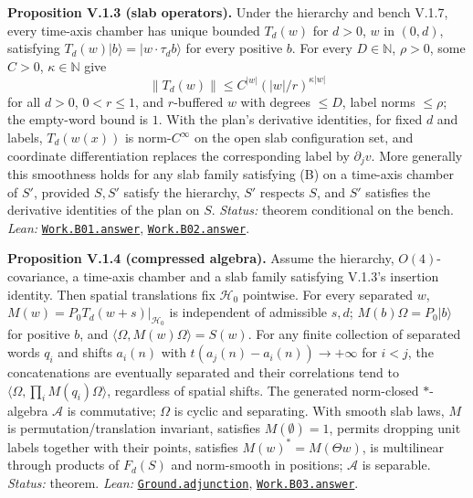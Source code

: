 \documentclass[
  letterpaper,
  11pt]{article}
\begin{document}
\textbf{Proposition V.1.3 (slab operators).} Under the hierarchy and
bench V.1.7, every time-axis chamber has unique bounded \(T_d(w)\) for
\(d>0\), \(w\) in \((0,d)\), satisfying
\(T_d(w)|b\rangle=|w\cdot\tau_db\rangle\) for every positive \(b\). For
every \(D\in\mathbb N\), \(\rho>0\), some \(C>0\),
\(\kappa\in\mathbb N\) give
\[\|T_d(w)\|\le C^{|w|}(|w|/r)^{\kappa|w|} \tag{B}\] for all \(d>0\),
\(0<r\le1\), and \(r\)-buffered \(w\) with degrees \(\le D\), label
norms \(\le\rho\); the empty-word bound is \(1\). With the plan's
derivative identities, for fixed \(d\) and labels, \(T_d(w(x))\) is
norm-\(C^\infty\) on the open slab configuration set, and coordinate
differentiation replaces the corresponding label by \(\partial_jv\).
More generally this smoothness holds for any slab family satisfying (B)
on a time-axis chamber of \(S'\), provided \(S,S'\) satisfy the
hierarchy, \(S'\) respects \(S\), and \(S'\) satisfies the derivative
identities of the plan on \(S\). \emph{Status:} theorem conditional on
the bench. \emph{Lean:}
\href{https://github.com/yang-mills-group/OpenAI-YM-20261028/blob/3456e5e75cf8d4cd558955a5c7638fba2d68f464/YM/Work/B01.lean\#L50-L71}{\texttt{Work.B01.answer}},
\href{https://github.com/yang-mills-group/OpenAI-YM-20261028/blob/3456e5e75cf8d4cd558955a5c7638fba2d68f464/YM/Work/B02.lean\#L17-L30}{\texttt{Work.B02.answer}}.

\textbf{Proposition V.1.4 (compressed algebra).} Assume the hierarchy,
\(O(4)\)-covariance, a time-axis chamber and a slab family satisfying
V.1.3's insertion identity. Then spatial translations fix
\(\mathcal H_0\) pointwise. For every separated \(w\),
\(M(w)=P_0T_d(w+s)|_{\mathcal H_0}\) is independent of admissible
\(s,d\); \(M(b)\Omega=P_0|b\rangle\) for positive \(b\), and
\(\langle\Omega,M(w)\Omega\rangle=S(w)\). For any finite collection of
separated words \(q_i\) and shifts \(a_i(n)\) with
\(t(a_j(n)-a_i(n))\to+\infty\) for \(i<j\), the concatenations are
eventually separated and their correlations tend to
\(\langle\Omega,\prod_iM(q_i)\Omega\rangle\), regardless of spatial
shifts. The generated norm-closed \(*\)-algebra \(\mathcal A\) is
commutative; \(\Omega\) is cyclic and separating. With smooth slab laws,
\(M\) is permutation/translation invariant, satisfies
\(M(\emptyset)=1\), permits dropping unit labels together with their
points, satisfies \(M(w)^*=M(\Theta w)\), is multilinear through
products of \(F_d(S)\) and norm-smooth in positions; \(\mathcal A\) is
separable. \emph{Status:} theorem. \emph{Lean:}
\href{https://github.com/yang-mills-group/OpenAI-YM-20261028/blob/3456e5e75cf8d4cd558955a5c7638fba2d68f464/YM/Ground/Permute.lean\#L149-L161}{\texttt{Ground.adjunction}},
\href{https://github.com/yang-mills-group/OpenAI-YM-20261028/blob/3456e5e75cf8d4cd558955a5c7638fba2d68f464/YM/Work/B03.lean\#L405-L415}{\texttt{Work.B03.answer}}.
\end{document}
